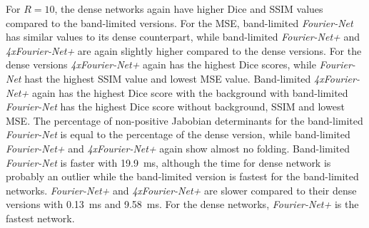 For $R=10$, the dense networks again have higher Dice and SSIM values compared to the band-limited versions. For the MSE, band-limited \emph{Fourier-Net} has similar values to its dense counterpart, while band-limited \emph{Fourier-Net+} and \emph{4xFourier-Net+} are again slightly higher compared to the dense versions. For the dense versions \emph{4xFourier-Net+} again has the highest Dice scores, while \emph{Fourier-Net} hast the highest SSIM value and lowest MSE value. Band-limited \emph{4xFourier-Net+} again has the highest Dice score with the background with band-limited \emph{Fourier-Net} has the highest Dice score without background, SSIM and lowest MSE. The percentage of non-positive Jabobian determinants for the band-limited \emph{Fourier-Net} is equal to the percentage of the dense version, while band-limited \emph{Fourier-Net+} and \emph{4xFourier-Net+} again show almost no folding. Band-limited \emph{Fourier-Net} is faster with 19.9~ms, although the time for dense network is probably an outlier while the band-limited version is fastest for the band-limited networks. \emph{Fourier-Net+} and \emph{4xFourier-Net+} are slower compared to their dense versions with 0.13~ms and 9.58~ms. For the dense networks, \emph{Fourier-Net+} is the fastest network.


